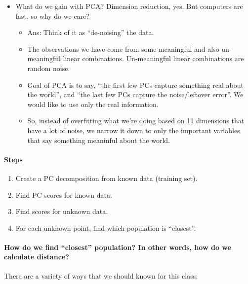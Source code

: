 \documentclass[]{article}
\providecommand{\tightlist}{%
  \setlength{\itemsep}{0pt}\setlength{\parskip}{0pt}}
\let\oldparagraph\paragraph
\renewcommand{\paragraph}[1]{\oldparagraph{#1}\mbox{}}
\begin{document}
\begin{itemize}
\tightlist
\item
  What do we gain with PCA? Dimension reduction, yes. But computers are
  fast, so why do we care?

  \begin{itemize}
  \tightlist
  \item
    Ans: Think of it as ``de-noising'' the data.
  \item
    The observations we have come from some meaningful and also
    un-meaningful linear combinations. Un-meaningful linear combinations
    are random noise.
  \item
    Goal of PCA is to say, ``the first few PCs capture something real
    about the world'', and ``the last few PCs capture the noise/leftover
    error''. We would like to use only the real information.
  \item
    So, instead of overfitting what we're doing based on 11 dimensions
    that have a lot of noise, we narrow it down to only the important
    variables that say something meaninful about the world.
  \end{itemize}
\end{itemize}

\hypertarget{steps}{%
\paragraph{Steps}\label{steps}}

\begin{enumerate}
\def\labelenumi{\arabic{enumi}.}
\tightlist
\item
  Create a PC decomposition from known data (training set).
\item
  Find PC scores for known data.
\item
  Find scores for unknown data.
\item
  For each unknown point, find which population is ``closest''.
\end{enumerate}

\hypertarget{how-do-we-find-closest-population-in-other-words-how-do-we-calculate-distance}{%
\paragraph{How do we find ``closest'' population? In other words, how do
we calculate
distance?}\label{how-do-we-find-closest-population-in-other-words-how-do-we-calculate-distance}}

There are a variety of ways that we should known for this class:
\end{document}
